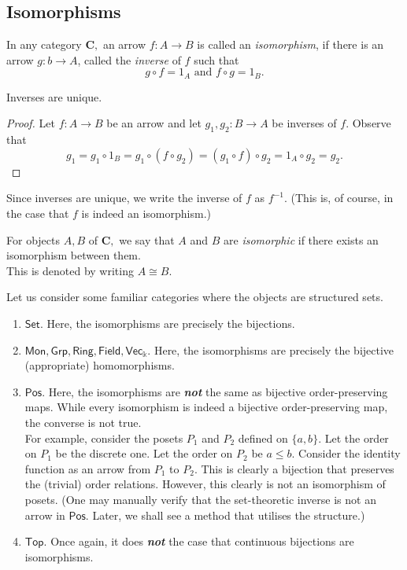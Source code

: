 \subsection{Isomorphisms}
\begin{defn} 
	In any category $\mathbf{C},$ an arrow $f:A\to B$ is called an \emph{isomorphism}, if there is an arrow $g:b\to A$, called the \emph{inverse} of $f$ such that
	\begin{equation*} 
		g\circ f = 1_A \text{ and } f\circ g = 1_B.
	\end{equation*}
\end{defn}
\begin{lem} 
	Inverses are unique.
\end{lem}
\begin{proof} 
	Let $f:A\to B$ be an arrow and let $g_1, g_2:B\to A$ be inverses of $f.$ Observe that
	\begin{equation*} 
		g_1 = g_1 \circ 1_B = g_1 \circ (f \circ g_2) = (g_1 \circ f) \circ g_2 = 1_A \circ g_2 = g_2.
	\end{equation*}
\end{proof}
Since inverses are unique, we write the inverse of $f$ as $f^{-1}.$ (This is, of course, in the case that $f$ is indeed an isomorphism.)\\
\begin{defn} 
	For objects $A, B$ of $\mathbf{C},$ we say that $A$ and $B$ are \emph{isomorphic} if there exists an isomorphism between them.\\
	This is denoted by writing $A \cong B.$
\end{defn}
\example{} Let us consider some familiar categories where the objects are structured sets.
\begin{enumerate}
	\item $\mathsf{Set}.$ Here, the isomorphisms are precisely the bijections.
	\item $\mathsf{Mon}, \mathsf{Grp}, \mathsf{Ring}, \mathsf{Field}, \mathsf{Vec}_\Bbbk.$ Here, the isomorphisms are precisely the bijective (appropriate) homomorphisms.
	\item $\mathsf{Pos}.$ Here, the isomorphisms are \emph{\textbf{not}} the same as bijective order-preserving maps. While every isomorphism is indeed a bijective order-preserving map, the converse is not true.\\
	For example, consider the posets $P_1$ and $P_2$ defined on $\{a, b\}.$ Let the order on $P_1$ be the discrete one. Let the order on $P_2$ be $a \le b.$ Consider the identity function as an arrow from $P_1$ to $P_2.$ This is clearly a bijection that preserves the (trivial) order relations. However, this clearly is not an isomorphism of posets. (One may manually verify that the set-theoretic inverse is not an arrow in $\mathsf{Pos}$. Later, we shall see a method that utilises the structure.)
	\item $\mathsf{Top}.$ Once again, it does \textbf{\emph{not}} the case that continuous bijections are isomorphisms.
\end{enumerate}
